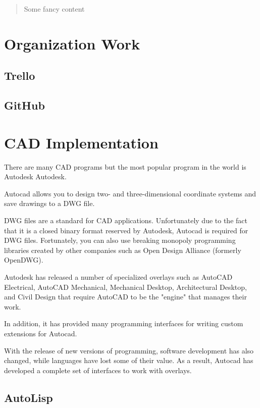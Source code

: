 \documentclass[a4paper, 11pt, article]{report}
\begin{document}
    \tableofcontents
    \newpage
    
    \begin{abstract}
   Some fancy content 
    
   \end{abstract}
   
   \chapter{Organization Work}
   
   \section{Trello}
   
   \section{GitHub}
   
   \chapter{CAD Implementation}
   
   There are many CAD programs but the most popular program in the world is Autodesk Autodesk.

Autocad allows you to design two- and three-dimensional coordinate systems and save drawings to a DWG file.

DWG files are a standard for CAD applications. Unfortunately due to the fact that it is a closed binary format reserved by Autodesk, Autocad is required for DWG files. Fortunately, you can also use breaking monopoly programming libraries created by other companies such as Open Design Alliance (formerly OpenDWG).

Autodesk has released a number of specialized overlays such as AutoCAD Electrical, AutoCAD Mechanical, Mechanical Desktop, Architectural Desktop, and Civil Design that require AutoCAD to be the "engine" that manages their work.

In addition, it has provided many programming interfaces for writing custom extensions for Autocad.

With the release of new versions of programming, software development has also changed, while languages have lost some of their value. As a result, Autocad has developed a complete set of interfaces to work with overlays.

\section{AutoLisp}
\end{document}
